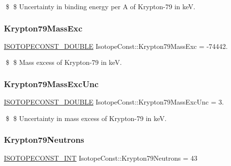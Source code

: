 \$ \$ Uncertainty in binding energy per A of Krypton-\/79 in keV. \mbox{\label{group___isotope_const-_krypton-_kr79_ga8872afdff4166a1035aa3e2f166d855c}} 
\subsubsection{\texorpdfstring{Krypton79\+Mass\+Exc}{Krypton79MassExc}}
{\footnotesize\ttfamily \mbox{\hyperlink{group___isotope_const-_macros_ga8f45a7272ce02c0b4c65c44636ed719a}{I\+S\+O\+T\+O\+P\+E\+C\+O\+N\+S\+T\+\_\+\+D\+O\+U\+B\+LE}} Isotope\+Const\+::\+Krypton79\+Mass\+Exc = -\/74442.}

\$ \$ Mass excess of Krypton-\/79 in keV. \mbox{\label{group___isotope_const-_krypton-_kr79_gaecfcd9d0de54286fa07a6d96c5f61cd4}} 
\subsubsection{\texorpdfstring{Krypton79\+Mass\+Exc\+Unc}{Krypton79MassExcUnc}}
{\footnotesize\ttfamily \mbox{\hyperlink{group___isotope_const-_macros_ga8f45a7272ce02c0b4c65c44636ed719a}{I\+S\+O\+T\+O\+P\+E\+C\+O\+N\+S\+T\+\_\+\+D\+O\+U\+B\+LE}} Isotope\+Const\+::\+Krypton79\+Mass\+Exc\+Unc = 3.}

\$ \$ Uncertainty in mass excess of Krypton-\/79 in keV. \mbox{\label{group___isotope_const-_krypton-_kr79_gab952b5145dcd130b268a81cf3dbaec74}} 
\subsubsection{\texorpdfstring{Krypton79\+Neutrons}{Krypton79Neutrons}}
{\footnotesize\ttfamily \mbox{\hyperlink{group___isotope_const-_macros_ga5f18360b3e99483a35c32d789e62621c}{I\+S\+O\+T\+O\+P\+E\+C\+O\+N\+S\+T\+\_\+\+I\+NT}} Isotope\+Const\+::\+Krypton79\+Neutrons = 43}

